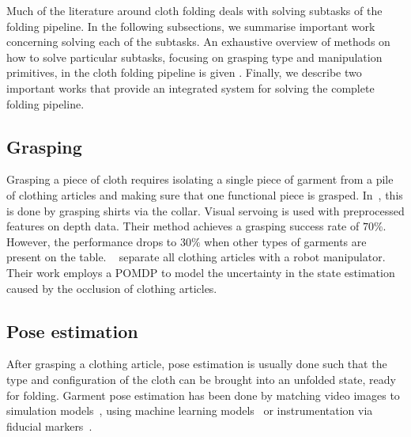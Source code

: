Much of the literature around cloth folding deals with solving subtasks of the folding pipeline. In the following subsections, we summarise important work concerning solving each of the subtasks. An exhaustive overview of methods on how to solve particular subtasks, focusing on grasping type and manipulation primitives, in the cloth folding pipeline is given \autocite{Borras2020}. Finally, we describe two important works that provide an integrated system for solving the complete folding pipeline. 

\subsection{Grasping}
Grasping a piece of cloth requires isolating a single piece of garment from a pile of clothing articles and making sure that one functional piece is grasped. In~\autocite{Ramisa2012}, this is done by grasping shirts via the collar. Visual servoing is used with preprocessed features on depth data. Their method achieves a grasping success rate of $70\%$. However, the performance drops to $30\%$ when other types of garments are present on the table. ~\autocite{Monso2012} separate all clothing articles with a robot manipulator. Their work employs a \acrshort{POMDP} to model the uncertainty in the state estimation caused by the occlusion of clothing articles.

\subsection{Pose estimation}
After grasping a clothing article, pose estimation is usually done such that the type and configuration of the cloth can be brought into an unfolded state, ready for folding. Garment pose estimation has been done by matching video images to simulation models~\autocite{Kita2002}, using machine learning models~\autocite{Li2014, li2014volum} or instrumentation via fiducial markers~\autocite{Bersch2011}.

